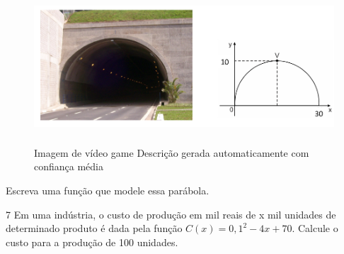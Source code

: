 \begin{escolha}
\begin{boxmedio}
\begin{boxmedio}
{\begin{boxpeq}
\begin{boxpeq}
{\begin{boxpeq}
\begin{boxmedio}
\begin{boxmedio}
\begin{boxpeq}
\begin{boxmedio}
\begin{boxpeq}
\begin{boxpeq}
\begin{boxpeq}
\begin{boxpeq}
\begin{boxmedio}
{\begin{boxmedio}
\begin{boxmedio}
\begin{boxpeq}
\begin{boxmedio}
\begin{boxpeq}
\begin{boxpeq}
\begin{boxpeq}
\begin{escolha}
{\begin{boxmedio}
\begin{boxpeq}
\begin{boxpeq}
\begin{boxpeq}
\begin{boxpeq}
\begin{boxpeq}
\begin{boxmedio}
\begin{boxpeq}
\begin{boxpeq}
\begin{boxpeq}
{\begin{boxpeq}
\begin{boxmedio}
\begin{boxpeq}
\begin{boxpeq}
\begin{boxpeq}
{\begin{boxpeq}
\begin{boxmedio}
{\begin{boxpeq}
\begin{boxpeq}
\begin{boxmedio}
\begin{boxmedio}
\begin{boxpeq}
\begin{figure}
\centering
\includegraphics[width=5.56667in,height=2.24198in]{./_SAEB_9_MAT/media/image143.png}
\caption{Imagem de vídeo game Descrição gerada automaticamente com
confiança média}
\end{figure}

Escreva uma função que modele essa parábola.



\num{7} Em uma indústria, o custo de produção em mil reais de x mil unidades
de determinado produto é dada pela função $ C(x) = 0,1^2 - 4x + 70$. Calcule 
o custo para a produção de 100 unidades.


\end{boxpeq}
\end{boxmedio}
\end{boxmedio}
\end{boxpeq}
\end{boxpeq}}
\end{boxmedio}
\end{boxpeq}}
\end{boxpeq}
\end{boxpeq}
\end{boxpeq}
\end{boxmedio}
\end{boxpeq}}
\end{boxpeq}
\end{boxpeq}
\end{boxpeq}
\end{boxmedio}
\end{boxpeq}
\end{boxpeq}
\end{boxpeq}
\end{boxpeq}
\end{boxpeq}
\end{boxmedio}}
\end{escolha}
\end{boxpeq}
\end{boxpeq}
\end{boxpeq}
\end{boxmedio}
\end{boxpeq}
\end{boxmedio}
\end{boxmedio}}
\end{boxmedio}
\end{boxpeq}
\end{boxpeq}
\end{boxpeq}
\end{boxpeq}
\end{boxmedio}
\end{boxpeq}
\end{boxmedio}
\end{boxmedio}
\end{boxpeq}}
\end{boxpeq}
\end{boxpeq}}
\end{boxmedio}
\end{boxmedio}
\end{escolha}
